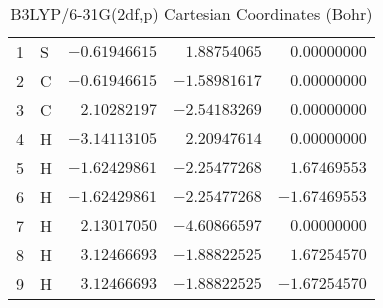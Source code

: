 \documentclass[10pt,oneside]{article}
\begin{document}
\begin{table}[h!]
\centering
\caption{B3LYP/6-31G(2df,p) Cartesian Coordinates (Bohr)}
\begin{tabular}{llrrr}
1  & S  & $-0.61946615$ & $ 1.88754065$ & $ 0.00000000$ \\
2  & C  & $-0.61946615$ & $-1.58981617$ & $ 0.00000000$ \\
3  & C  & $ 2.10282197$ & $-2.54183269$ & $ 0.00000000$ \\
4  & H  & $-3.14113105$ & $ 2.20947614$ & $ 0.00000000$ \\
5  & H  & $-1.62429861$ & $-2.25477268$ & $ 1.67469553$ \\
6  & H  & $-1.62429861$ & $-2.25477268$ & $-1.67469553$ \\
7  & H  & $ 2.13017050$ & $-4.60866597$ & $ 0.00000000$ \\
8  & H  & $ 3.12466693$ & $-1.88822525$ & $ 1.67254570$ \\
9  & H  & $ 3.12466693$ & $-1.88822525$ & $-1.67254570$ \\
\end{tabular}
\end{table}

\clearpage
\end{document}

